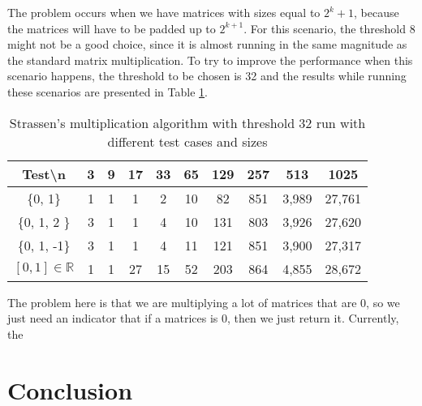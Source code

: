 \documentclass[tikz, 12pt]{scrartcl}
\begin{document}
The problem occurs when we have matrices with sizes equal to $2^k + 1$, because the matrices will have to be padded up to $2^{k+1}$. For this scenario, the threshold 8 might not be a good choice, since it is almost running in the same magnitude as the standard matrix multiplication. To try to improve the performance when this scenario happens, the threshold to be chosen is 32 and the results while running these scenarios are presented in Table \ref{strassenPaddingOdd}.

\begin{table}[h!]
\caption{Strassen's multiplication algorithm with threshold 32 run with different test cases and sizes\label{strassenPaddingOdd}}
\centering
\begin{tabular}{|c|ccccccccc|}
\hline
Test\textbackslash  n		&	3	&	9	&	17	&	33	&	65	&	129	&	257		&	513		&	1025\\
\hline
\{0, 1\}				&	1	&	1	&	1	&	2	&	10	&	82	&	851		&	3,989	&	27,761\\
\{0, 1, 2 \}				&	3	&	1	&	1	&	4	&	10	&	131	&	803		&	3,926	&	27,620\\
\{0, 1, -1\}				&	3	&	1	&	1	&	4	&	11	&	121	&	851		&	3,900	&	27,317\\
$[0, 1] \in \mathbb{R}$	&	1	&	1	&	27	&	15	&	52	&	203	&	864		&	4,855	&	28,672\\
\hline
\end{tabular}
\end{table}

The problem here is that we are multiplying a lot of matrices that are $0$, so we just need an indicator that if a matrices is 0, then we just return it. Currently, the


\section{Conclusion}
\end{document}
